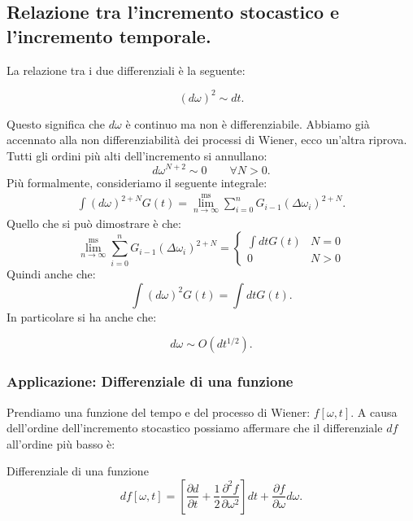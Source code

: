 \subsection{Relazione tra l'incremento stocastico e l'incremento temporale.}%
\label{sub:Relazione tra l'incremento stocastico e l'incremento temporale.}
La relazione tra i due differenziali è la seguente:
\begin{greenbox}{}
\[
    \left(d\omega\right)^2\sim dt
.\] 
\end{greenbox}
\noindent
Questo significa che $d\omega$  è continuo ma non è differenziabile. Abbiamo già accennato alla non differenziabilità dei processi di Wiener, ecco un'altra riprova.\\
Tutti gli ordini più alti dell'incremento si annullano:
\[
    d\omega^{N+2} \sim 0 \qquad \forall N>0
.\] 
Più formalmente, consideriamo il seguente integrale:
\[\begin{aligned}
    \int\left(d\omega\right)^{2+N}G(t) = \lim^{\text{ms}}_{n \to \infty} \sum_{i=0}^{n} G_{i-1} (\Delta\omega_i)^{2+N} 
.\end{aligned}\]
Quello che si può dimostrare è che:
\[
  \lim^{\text{ms}}_{n \to \infty} \sum_{i=0}^{n} G_{i-1} (\Delta\omega_i)^{2+N} = 
  \begin{cases}
      \int dtG(t) & N=0\\
      0          & N>0 
  \end{cases}
\] 
Quindi anche che:
\[
    \int\left(d\omega\right)^2 G(t) = \int dtG(t) 
.\] 
In particolare si ha anche che:
\begin{redbox}{}
    \[
	d\omega  \sim O(dt^{1 /2}) 
    .\] 
\end{redbox}
\noindent
\subsubsection{Applicazione: Differenziale di una funzione}%
\label{subsub:Applicazione: Differenziale di una funzione}
Prendiamo una funzione del tempo e del processo di Wiener: $f\left[\omega,t\right]$. A causa dell'ordine dell'incremento stocastico possiamo affermare che il differenziale $df$  all'ordine più basso è:
\begin{bluebox}{Differenziale di una funzione}
    \[
	df\left[\omega,t\right] = \left[\frac{\partial d}{\partial t} + \frac{1}{2}\frac{\partial ^2 f}{\partial \omega^2} \right]dt + \frac{\partial f}{\partial \omega} d\omega
    .\] 
\end{bluebox}
\noindent
